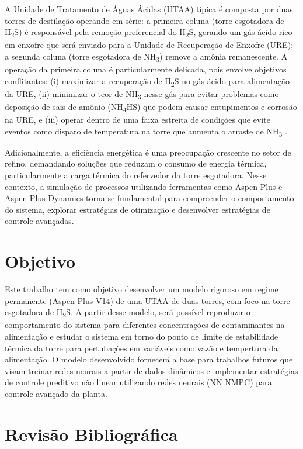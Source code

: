 \documentclass[10pt,a4paper]{article}
\begin{document}
A Unidade de Tratamento de Águas Ácidas (UTAA) típica é composta por duas torres de destilação operando em série: a primeira coluna (torre esgotadora de H\textsubscript{2}S) é responsável pela remoção preferencial do H\textsubscript{2}S, gerando um gás ácido rico em enxofre que será enviado para a Unidade de Recuperação de Enxofre (URE); a segunda coluna (torre esgotadora de NH\textsubscript{3}) remove a amônia remanescente. A operação da primeira coluna é particularmente delicada, pois envolve objetivos conflitantes: (i) maximizar a recuperação de H\textsubscript{2}S no gás ácido para alimentação da URE, (ii) minimizar o teor de NH\textsubscript{3} nesse gás para evitar problemas como deposição de sais de amônio (NH\textsubscript{4}HS) que podem causar entupimentos e corrosão na URE, e (iii) operar dentro de uma faixa estreita de condições que evite eventos como disparo de temperatura na torre que aumenta o arraste de NH\textsubscript{3} \cite{knust2013}.

Adicionalmente, a eficiência energética é uma preocupação crescente no setor de refino, demandando soluções que reduzam o consumo de energia térmica, particularmente a carga térmica do refervedor da torre esgotadora. Nesse contexto, a simulação de processos utilizando ferramentas como Aspen Plus e Aspen Plus Dynamics torna-se fundamental para compreender o comportamento do sistema, explorar estratégias de otimização e desenvolver estratégias de controle avançadas.

\section{Objetivo}\label{sec:objetivo}

Este trabalho tem como objetivo desenvolver um modelo rigoroso em regime permanente (Aspen Plus V14) de uma UTAA de duas torres, com foco na torre esgotadora de H\textsubscript{2}S. A partir desse modelo, será possível reproduzir o comportamento do sistema para diferentes concentrações de contaminantes na alimentação e estudar o sistema em torno do ponto de limite de estabilidade térmica da torre para pertubações em variáveis como vazão e tempertura da alimentação. O modelo desenvolvido fornecerá a base para trabalhos futuros que visam treinar redes neurais a partir de dados dinâmicos e implementar estratégias de controle preditivo não linear utilizando redes neurais (NN NMPC) para controle avançado da planta.

\section{Revisão Bibliográfica}\label{sec:bibliografia}
\end{document}
